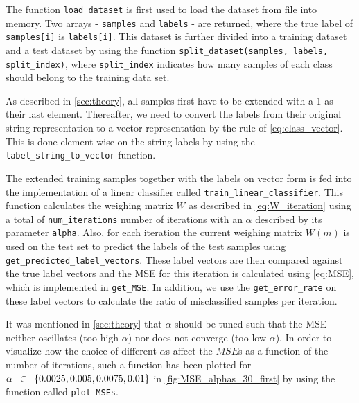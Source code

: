 \documentclass{article}
\begin{document}
The function \lstinline{load_dataset} is first used to load the dataset from file into memory.
Two arrays - \lstinline{samples} and \lstinline{labels} - are returned, where the true label of
\lstinline{samples[i]} is \lstinline{labels[i]}. This dataset is further divided into a training
dataset and a test  dataset by using the function \lstinline{split_dataset(samples, labels, split_index)},
where \lstinline{split_index} indicates how many samples of each class should belong to the training
data set.

As described in \autoref{sec:theory}, all samples first have to be extended with a 1 as their last element.
Thereafter, we need to convert the labels from their original string representation to a vector
representation by the rule of \eqref{eq:class_vector}. This is done element-wise on the string labels by
using the \lstinline{label_string_to_vector} function.

The extended training samples together with the labels on vector form is fed into the implementation of
a linear classifier called \lstinline{train_linear_classifier}. This function calculates the weighing matrix
$W$ as described in \eqref{eq:W_iteration} using a total of \lstinline{num_iterations} number of iterations
with an $\alpha$ described by its parameter \lstinline{alpha}. Also, for each iteration the current weighing
matrix $W(m)$ is used on the test set to predict the labels of the test samples using
\lstinline{get_predicted_label_vectors}. These label vectors are then compared against the true
label vectors and the MSE for this iteration is calculated using \eqref{eq:MSE}, which is implemented
in \lstinline{get_MSE}. In addition, we use the \lstinline{get_error_rate} on these label vectors
to calculate the ratio of misclassified samples per iteration.

It was mentioned in \autoref{sec:theory} that $\alpha$ should be tuned such that the MSE neither
oscillates (too high $\alpha$) nor does not converge (too low $\alpha$). In order to visualize
how the choice of different $\alpha$s affect the $MSE$s as a function of the number of iterations,
such a function has been plotted for $\alpha \enskip \in \enskip \{0.0025, 0.005, 0.0075, 0.01\}$
in \autoref{fig:MSE_alphas_30_first} by using the function called \lstinline{plot_MSEs}.
\end{document}
